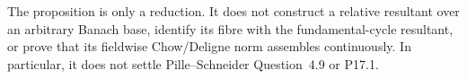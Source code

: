 \begin{remark}
\label{rem:p171-closed-immersion-reduction-scope}
The proposition is only a reduction.  It does not construct a relative
resultant over an arbitrary Banach base, identify its fibre with the
fundamental-cycle resultant, or prove that its fieldwise Chow/Deligne norm
assembles continuously.  In particular, it does not settle Pille--Schneider
Question~4.9 or P17.1.
\end{remark}
